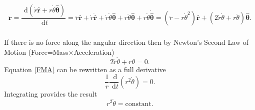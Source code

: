 \documentclass[]{article}
\newcommand{\bb}{\begin{equation}}
\newcommand{\ee}{\end{equation}}
\newcommand{\rd}{\text{ d}}
\renewcommand{\l}{\left(}
\renewcommand{\r}{\right)}
\begin{document}
\begin{Answ}
\subsubsection{}
\bb
\ddot{\bm{r}}=\frac{\rd \l \dot{r}\hat{\bm{r}}+r\dot{\theta}\hat{\bm{\theta}} \r}{\rd t}=\ddot{r}\hat{\bm{r}}+\dot{r}\dot{\hat{\bm{r}}}+\dot{r}\dot{\theta}\hat{\bm{\theta}}+r\ddot{\theta}\hat{\bm{\theta}}+r\dot{\theta}\dot{\hat{\bm{\theta}}}=\l \ddot{r}-r\dot{\theta}^2\r\hat{\bm{r}}+\l 2\dot{r}\dot{\theta}+r\ddot{\theta}\r\hat{\bm{\theta}}.
\ee
\subsubsection{}
If there is no force along the angular direction then by Newton's Second Law of Motion (Force=Mass$\times$Acceleration)
\bb
2\dot{r}\dot{\theta}+r\ddot{\theta}=0.\label{FMA}
\ee
Equation \eqref{FMA} can be rewritten as a full derivative
\bb
\frac{1}{r}\frac{\rd}{\rd t}\l r^2\dot{\theta}\r=0.
\ee
Integrating provides the result
\bb
r^2\dot{\theta}=\textrm{constant}.
\ee
\end{Answ}
\end{document}
